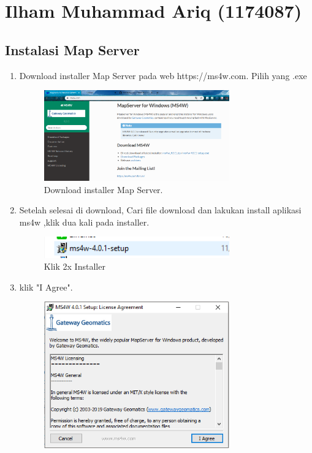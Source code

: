 \section{Ilham Muhammad Ariq (1174087)}
\subsection{Instalasi Map Server}
\begin{enumerate}
	\item  Download installer Map Server pada web https://ms4w.com. Pilih yang .exe
	\hfill\break
	\begin{figure}[H]
		\includegraphics[width=8cm]{figures/Tugas4/1174087/1.png}
		\centering
		\caption{Download installer Map Server.}
	\end{figure}
	\item  Setelah selesai di download, Cari file download dan lakukan install aplikasi ms4w ,klik dua kali pada installer.
	\hfill\break
	\begin{figure}[H]
		\includegraphics[width=8cm]{figures/Tugas4/1174087/2.png}
		\centering
		\caption{Klik 2x Installer}
	\end{figure}
	\item  klik "I Agree".
	\hfill\break
	\begin{figure}[H]
		\includegraphics[width=8cm]{figures/Tugas4/1174087/3.png}
		\centering

\end{figure}
\end{enumerate}
